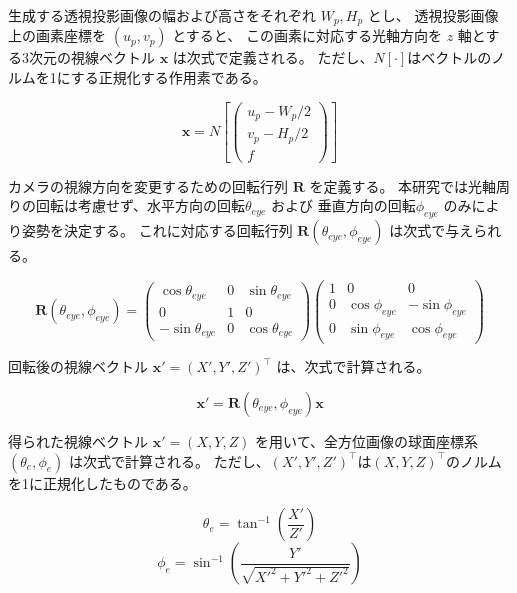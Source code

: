 生成する透視投影画像の幅および高さをそれぞれ $W_p, H_p$ とし、
透視投影画像上の画素座標を $(u_p, v_p)$ とすると、
この画素に対応する光軸方向を $z$ 軸とする3次元の視線ベクトル $\bm{x}$ は次式で定義される。
ただし、$N[ \cdot ]$はベクトルのノルムを1にする正規化する作用素である。

\begin{equation}
\bm{x} = N[
\begin{pmatrix}
u_p - W_p/2 \\
v_p - H_p/2 \\
f
\end{pmatrix}
]
\end{equation}

カメラの視線方向を変更するための回転行列 $\bm{R}$ を定義する。
本研究では光軸周りの回転は考慮せず、水平方向の回転$\theta_{eye}$ および 垂直方向の回転$\phi_{eye}$ のみにより姿勢を決定する。
これに対応する回転行列 $\bm{R}(\theta_{eye}, \phi_{eye})$ は次式で与えられる。

\begin{equation}
\bm{R}(\theta_{eye}, \phi_{eye}) = 
\begin{pmatrix}
\cos \theta_{eye} & 0 & \sin \theta_{eye} \\
0 & 1 & 0 \\
-\sin \theta_{eye} & 0 & \cos \theta_{eye}
\end{pmatrix}
\begin{pmatrix}
1 & 0 & 0 \\
0 & \cos \phi_{eye} & -\sin \phi_{eye} \\
0 & \sin \phi_{eye} & \cos \phi_{eye}
\end{pmatrix}
\end{equation}

回転後の視線ベクトル $\bm{x}' = (X', Y', Z')^\top$ は、次式で計算される。

\begin{equation}
\bm{x}' = \bm{R}(\theta_{eye}, \phi_{eye}) \bm{x}
\end{equation}

得られた視線ベクトル $\bm{x}'=(X,Y,Z)$ を用いて、全方位画像の球面座標系 $(\theta_e, \phi_e)$ は次式で計算される。
ただし、$(X',Y',Z')^\top$は$(X,Y,Z)^\top$のノルムを1に正規化したものである。

\begin{equation}
\theta_e = \tan^{-1}\left(\frac{X'}{Z'}\right)
\end{equation}
\begin{equation}
\phi_e = \sin^{-1}\left(\frac{Y'}{\sqrt{X'^2 + Y'^2 + Z'^2}}\right)
\end{equation}

